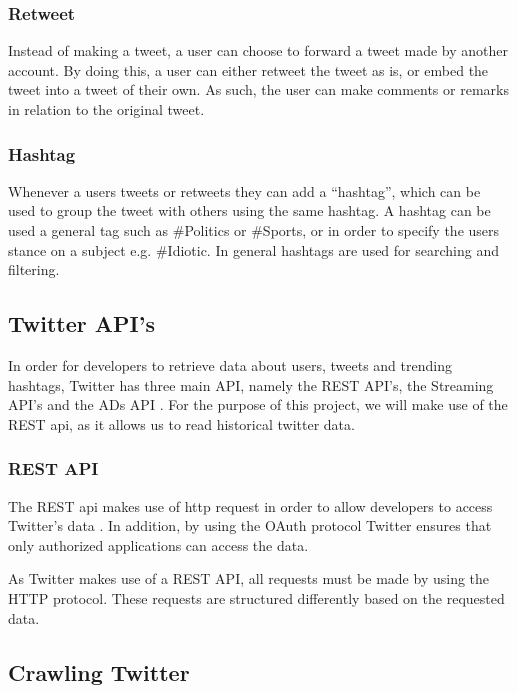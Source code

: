 \subsubsection{Retweet}
Instead of making a tweet, a user can choose to forward a tweet made by another
account. By doing this, a user can either retweet the tweet as is, or embed the
tweet into a tweet of their own. As such, the user can make comments or remarks
in relation to the original tweet.

\subsubsection{Hashtag}
Whenever a users tweets or retweets they can add a ``hashtag'', which can be
used to group the tweet with others using the same hashtag. A hashtag can be
used a general tag such as \#Politics or \#Sports, or in order to specify the
users stance on a subject e.g. \#Idiotic. In general hashtags are used for
searching and filtering.

\subsection{Twitter API's}
In order for developers to retrieve data about users, tweets and trending
hashtags, Twitter has three main API, namely the REST API's, the Streaming API's
and the ADs API \citep{TwitterDevDocs}. For the purpose of this project,
we will make use of the REST api, as it allows us to read historical twitter
data.

\subsubsection{REST API}
The REST api makes use of http request in order to allow developers to access
Twitter's data \citep{TwitterREST}. In addition, by using the OAuth protocol
\citep{TwitterOAuth} Twitter ensures that only authorized applications can
access the data.\nl

As Twitter makes use of a REST API, all requests must be made by using the HTTP
protocol. These requests are structured differently based on the requested data.














\subsection{Crawling Twitter}
